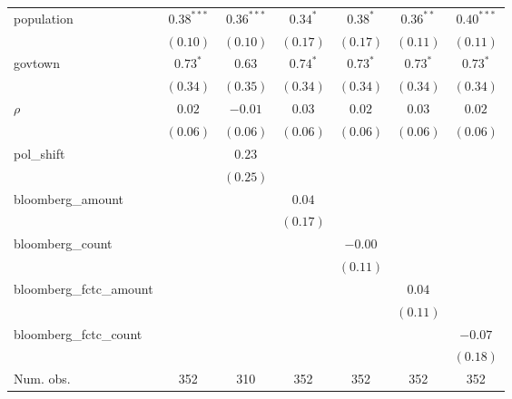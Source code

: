 \begin{table}[!h]
\begin{center}
\begin{tabular}{l c c c c c c }
population              & $0.38^{***}$ & $0.36^{***}$  & $0.34^{*}$   & $0.38^{*}$   & $0.36^{**}$  & $0.40^{***}$ \\
                        & $(0.10)$     & $(0.10)$      & $(0.17)$     & $(0.17)$     & $(0.11)$     & $(0.11)$     \\
govtown                 & $0.73^{*}$   & $0.63$        & $0.74^{*}$   & $0.73^{*}$   & $0.73^{*}$   & $0.73^{*}$   \\
                        & $(0.34)$     & $(0.35)$      & $(0.34)$     & $(0.34)$     & $(0.34)$     & $(0.34)$     \\
$\rho$                  & $0.02$       & $-0.01$       & $0.03$       & $0.02$       & $0.03$       & $0.02$       \\
                        & $(0.06)$     & $(0.06)$      & $(0.06)$     & $(0.06)$     & $(0.06)$     & $(0.06)$     \\
pol\_shift              &              & $0.23$        &              &              &              &              \\
                        &              & $(0.25)$      &              &              &              &              \\
bloomberg\_amount       &              &               & $0.04$       &              &              &              \\
                        &              &               & $(0.17)$     &              &              &              \\
bloomberg\_count        &              &               &              & $-0.00$      &              &              \\
                        &              &               &              & $(0.11)$     &              &              \\
bloomberg\_fctc\_amount &              &               &              &              & $0.04$       &              \\
                        &              &               &              &              & $(0.11)$     &              \\
bloomberg\_fctc\_count  &              &               &              &              &              & $-0.07$      \\
                        &              &               &              &              &              & $(0.18)$     \\
\midrule
Num. obs.               & 352          & 310           & 352          & 352          & 352          & 352          \\

\end{tabular}
\end{center}
\end{table}
